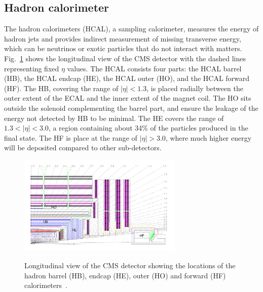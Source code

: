\subsection*{Hadron calorimeter}
The hadron calorimeters (HCAL), a sampling calorimeter, measures the energy of hadron jets and provides indirect measurement of missing transverse energy, which can be neutrinos or exotic particles that do not interact with matters.  
Fig.~\ref{fig:HCalLayout} shows the longitudinal view of the CMS detector with the dashed lines representing fixed $\eta$ values. 
The HCAL consists four parts: the HCAL barrel (HB), the HCAL endcap (HE), the HCAL outer (HO), and the HCAL forward (HF). 
The HB, covering the range of $|\eta|<1.3$, is placed radially between the outer extent of the ECAL and the inner extent of the magnet coil. The HO sits outside the solenoid complementing the barrel part, and ensure the leakage of the energy not detected by HB to be minimal.
The HE covers the range of $1.3<|\eta|<3.0$, a region containing about 34\% of the particles produced in the final state.
The HF is place at the range of $|\eta|>3.0$, where much higher energy will be deposited compared to other sub-detectors.  
\begin{figure}[!ht]
  \begin{center}
  \includegraphics[width=0.7\textwidth]{Fig/CMS_Detector/HCAL_layout}\\
    \caption{Longitudinal view of the CMS detector showing the locations of the hadron barrel (HB), endcap (HE), outer (HO) and forward (HF) calorimeters~\cite{Chatrchyan:2008aa}. \label{fig:HCalLayout}}
  \end{center}
\end{figure}

